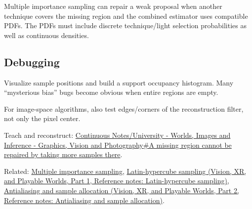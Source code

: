 \hypertarget{appendix-10308c3d753e-mis-support}{}

Multiple importance sampling can repair a weak proposal when another technique covers the missing region and the combined estimator uses compatible PDFs. The PDFs must include discrete technique/light selection probabilities as well as continuous densities.

\subsection{Debugging}\label{appendix-10308c3d753e-debugging}

\hypertarget{appendix-10308c3d753e-debugging}{}

Visualize sample positions and build a support occupancy histogram. Many ``mysterious bias'' bugs become obvious when entire regions are empty.

For image-space algorithms, also test edges/corners of the reconstruction filter, not only the pixel center.

Teach and reconstruct: \hyperref[03-visual-computing-i-ch007-a-missing-region-cannot-be-repaired-by-taking-more-samples-there]{Continuous Notes/University - Worlds, Images and Inference - Graphics, Vision and Photography\#A missing region cannot be repaired by taking more samples there}.

Related: \hyperref[appendix-ca8898faf1a6]{Multiple importance sampling}, \href{../07-Vision-XR-and-Playable-Worlds-P01/main.pdf\#appendix-1c5e85693a06}{Latin-hypercube sampling (Vision, XR, and Playable Worlds, Part 1, Reference notes: Latin-hypercube sampling)}, \href{../07-Vision-XR-and-Playable-Worlds-P02/main.pdf\#appendix-4192b2bdd21e}{Antialiasing and sample allocation (Vision, XR, and Playable Worlds, Part 2, Reference notes: Antialiasing and sample allocation)}.
